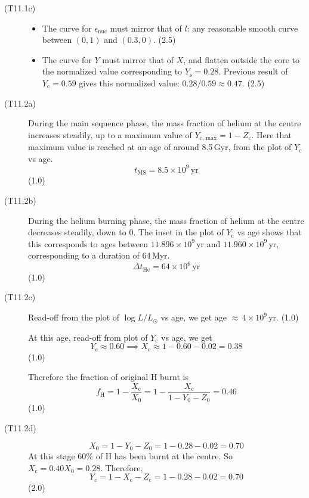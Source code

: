 \begin{description}
\item[(T11.1c)]\mbox{}
  \begin{itemize}
  \item The curve for $\epsilon_{\mathrm{nuc}}$ must mirror that of $l$: any
    reasonable smooth curve between $(0,1)$ and $(0.3,0)$. \hfill(2.5)
  \item The curve for $Y$ must mirror that of $X$, and flatten outside the
    core to the normalized value corresponding to $Y_{\mathrm{s}} = 0.28$.
    Previous result of $Y_{\mathrm{c}} = 0.59$ gives this normalized value:
    $0.28/0.59 \approx 0.47$. \hfill(2.5)
  \end{itemize}

\item[(T11.2a)] During the main sequence phase, the mass fraction of helium at
  the centre increases steadily, up to a maximum value of
  $Y_{\mathrm{c,\,max}} = 1 - Z_{\mathrm{c}}$. Here that maximum value is
  reached at an age of around 8.5\,Gyr, from the plot of $Y_{\mathrm{c}}$ vs
  age.
  \[
    t_{\mathrm{MS}} = 8.5 \times 10^{9}\,\mathrm{yr}
  \]
  \hfill(1.0)

\item[(T11.2b)] During the helium burning phase, the mass fraction of helium
  at the centre decreases steadily, down to 0. The inset in the plot of
  $Y_{\mathrm{c}}$ vs age shows that this corresponds to ages between
  $11.896 \times 10^{9}$\,yr and $11.960 \times 10^{9}$\,yr, corresponding to
  a duration of 64\,Myr.
  \[
    \Delta t_{\mathrm{He}} = 64 \times 10^{6}\,\mathrm{yr}
  \]
  \hfill(1.0)

\item[(T11.2c)] Read-off from the plot of $\log L/L_\odot$ vs age, we get age
  ${\approx}\,4 \times 10^{9}$\,yr. \hfill(1.0)

  At this age, read-off from plot of $Y_{\mathrm{c}}$ vs age, we get
  \[
    Y_{\mathrm{c}} \approx 0.60 \implies
    X_{\mathrm{c}} \approx 1 - 0.60 - 0.02 = 0.38
  \]
  \hfill(1.0)

  Therefore the fraction of original H burnt is
  \[
    f_{\mathrm{H}} = 1 - \frac{X_{\mathrm{c}}}{X_0}
    = 1 - \frac{X_{\mathrm{c}}}{1 - Y_0 - Z_0} = 0.46
  \]
  \hfill(1.0)

\item[(T11.2d)]
  \[
    X_0 = 1 - Y_0 - Z_0 = 1 - 0.28 - 0.02 = 0.70
  \]
  At this stage 60\% of H has been burnt at the centre. So
  $X_{\mathrm{c}} = 0.40 X_0 = 0.28$. Therefore,
  \[
    Y_{\mathrm{c}} = 1 - X_{\mathrm{c}} - Z_{\mathrm{c}}
    = 1 - 0.28 - 0.02 = 0.70
  \]
  \hfill(2.0)


\end{description}
